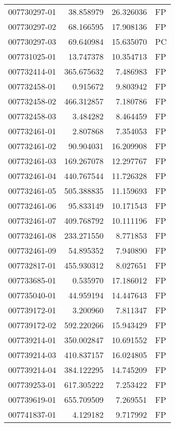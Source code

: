 \begin{tabular}{lrrl}
007730297-01 &   38.858979 &      26.326036 &   FP \\
007730297-02 &   68.166595 &      17.908136 &   FP \\
007730297-03 &   69.640984 &      15.635070 &   PC \\
007731025-01 &   13.747378 &      10.354713 &   FP \\
007732414-01 &  365.675632 &       7.486983 &   FP \\
007732458-01 &    0.915672 &       9.803942 &   FP \\
007732458-02 &  466.312857 &       7.180786 &   FP \\
007732458-03 &    3.484282 &       8.464459 &   FP \\
007732461-01 &    2.807868 &       7.354053 &   FP \\
007732461-02 &   90.904031 &      16.209908 &   FP \\
007732461-03 &  169.267078 &      12.297767 &   FP \\
007732461-04 &  440.767544 &      11.726328 &   FP \\
007732461-05 &  505.388835 &      11.159693 &   FP \\
007732461-06 &   95.833149 &      10.171543 &   FP \\
007732461-07 &  409.768792 &      10.111196 &   FP \\
007732461-08 &  233.271550 &       8.771853 &   FP \\
007732461-09 &   54.895352 &       7.940890 &   FP \\
007732817-01 &  455.930312 &       8.027651 &   FP \\
007733685-01 &    0.535970 &      17.186012 &   FP \\
007735040-01 &   44.959194 &      14.447643 &   FP \\
007739172-01 &    3.200960 &       7.811347 &   FP \\
007739172-02 &  592.220266 &      15.943429 &   FP \\
007739214-01 &  350.002847 &      10.691552 &   FP \\
007739214-03 &  410.837157 &      16.024805 &   FP \\
007739214-04 &  384.122295 &      14.745209 &   FP \\
007739253-01 &  617.305222 &       7.253422 &   FP \\
007739619-01 &  655.709509 &       7.269551 &   FP \\
007741837-01 &    4.129182 &       9.717992 &   FP \\

\end{tabular}
